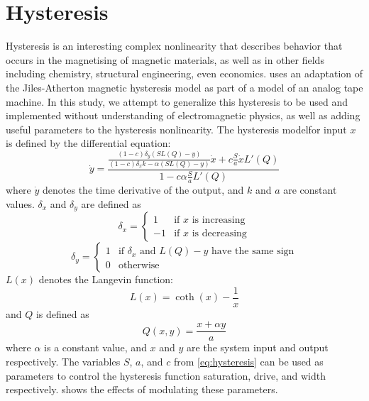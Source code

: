\documentclass[twoside,a4paper]{article}
\begin{document}
\section{Hysteresis} \label{sec:hysteresis}
%
Hysteresis is an interesting complex nonlinearity that describes
behavior that occurs in the magnetising of magnetic materials, as
well as in other fields including chemistry, structural engineering,
even economics. \cite{DAFX-tape} uses an adaptation of the Jiles-Atherton
magnetic hysteresis model as part of a model of an analog tape machine.
In this study, we attempt to generalize this hysteresis to be used
and implemented without understanding of electromagnetic physics,
as well as adding useful parameters to the hysteresis nonlinearity.
\newline\newline
%
The hysteresis modelfor input $x$ is defined by the differential equation:
%
\begin{equation}
    \dot{y} = \frac{\frac{(1-c)\delta_y(SL(Q) - y)}{(1-c)\delta_xk - \alpha(SL(Q) - y)}\dot{x} + c \frac{S}{a} \dot{x} L'(Q)}{1 - c\alpha \frac{S}{a} L'(Q)}
    \label{eq:hysteresis}
\end{equation}
%
where $\dot{y}$ denotes the time derivative of the output, and $k$ and
$a$ are constant values. $\delta_x$ and $\delta_y$ are defined as
%
\begin{equation}
    \delta_x = \begin{cases} 1 & \text{if $x$ is increasing} \\ -1 & \text{if $x$ is decreasing} \end{cases}
    \label{eq:delta-x}
\end{equation}
%
\begin{equation}
    \delta_y = \begin{cases} 1 & \text{if $\delta_x$ and $L(Q) - y$ have the same sign} \\ 0 & \text{otherwise} \end{cases}
    \label{eq:delta-y}
\end{equation}
%
$L(x)$ denotes the Langevin function:
%
\begin{equation}
    L(x) = \coth(x) - \frac{1}{x}
    \label{eq:langevin}
\end{equation}
%
and $Q$ is defined as
%
\begin{equation}
    Q(x,y) = \frac{x + \alpha y}{a}
    \label{eq:hyst-q}
\end{equation}
%
where $\alpha$ is a constant value, and $x$ and $y$ are the system input
and output respectively.
\newline\newline
The variables $S$, $a$, and $c$ from \cref{eq:hysteresis} can be used
as parameters to control the hysteresis function saturation, drive,
and width respectively.  shows the effects of modulating
these parameters.
\end{document}
